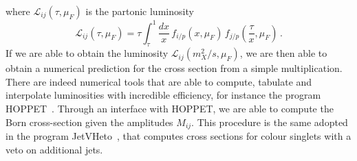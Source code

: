 \documentclass[12pt,a4wide]{article}
\begin{document}
where $\mathcal{L}_{ij}\left(\tau,\mu_F\right)$ is the partonic luminosity
\begin{equation}
  \label{eq:hoppet-lumi}
  \mathcal{L}_{ij}\left(\tau,\mu_F\right) = \tau \int_\tau^1 \frac{dx}{x}\, f_{i/p}(x,\mu_F)\, f_{j/p}\left(\frac{\tau}{x},\mu_F\right)\,.
\end{equation}
If we are able to obtain the luminosity
$\mathcal{L}_{ij}\left(m_X^2/s,\mu_F\right)$, we are then able to
obtain a numerical prediction for the cross section from a simple
multiplication. There are indeed numerical tools that are able to
compute, tabulate and interpolate luminosities with incredible
efficiency, for instance the program
HOPPET~\cite{Salam:2008qg}. Through an interface with HOPPET, we are
able to compute the Born cross-section given the amplitudes
$M_{ij}$. This procedure is the same adopted in the program
JetVHeto~\cite{Banfi:2015pju}, that computes cross sections for colour
singlets with a veto on additional jets.
\end{document}
